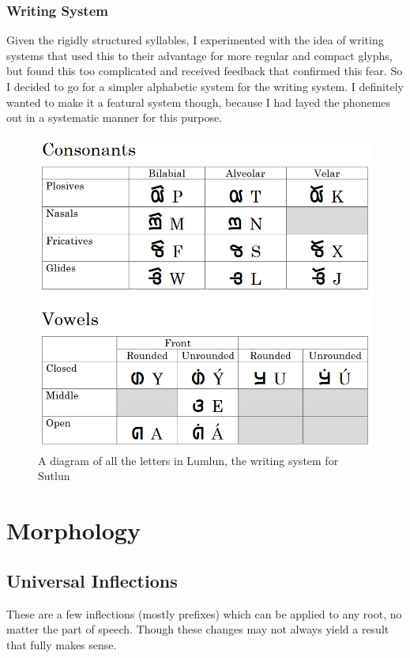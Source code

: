 \documentclass{book}
\begin{document}
\subsection{Writing System}
Given the rigidly structured syllables, I experimented with the idea of writing systems that used this
to their advantage for more regular and compact glyphs, but found this too complicated and received
feedback that confirmed this fear. So I decided to go for a simpler alphabetic system for the writing
system. I definitely wanted to make it a featural system though, because I had layed the phonemes out
in a systematic manner for this purpose.

\begin{figure}
	\centering
	\includegraphics[scale=0.5]{Lumlun-Diagram.png}
	\caption{A diagram of all the letters in Lumlun, the writing system for Sutlun}
	\label{lumlun-diagram}
\end{figure}



\chapter{Morphology}
\section{Universal Inflections}
These are a few inflections (mostly prefixes) which can be applied to any root, no matter the
part of speech. Though these changes may not always yield a result that fully makes sense.
\end{document}
